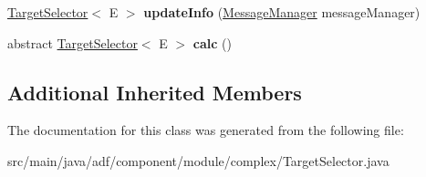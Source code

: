 \begin{DoxyCompactItemize}
\hypertarget{classadf_1_1component_1_1module_1_1complex_1_1TargetSelector_a91278e0b3b662efd8617e96309248942}{}\label{classadf_1_1component_1_1module_1_1complex_1_1TargetSelector_a91278e0b3b662efd8617e96309248942} 
\hyperlink{classadf_1_1component_1_1module_1_1complex_1_1TargetSelector}{Target\+Selector}$<$ E $>$ {\bfseries update\+Info} (\hyperlink{classadf_1_1agent_1_1communication_1_1MessageManager}{Message\+Manager} message\+Manager)
\item 
\hypertarget{classadf_1_1component_1_1module_1_1complex_1_1TargetSelector_a1e776672858945c16604c7e7e2e8eafe}{}\label{classadf_1_1component_1_1module_1_1complex_1_1TargetSelector_a1e776672858945c16604c7e7e2e8eafe} 
abstract \hyperlink{classadf_1_1component_1_1module_1_1complex_1_1TargetSelector}{Target\+Selector}$<$ E $>$ {\bfseries calc} ()
\end{DoxyCompactItemize}
\subsection*{Additional Inherited Members}


The documentation for this class was generated from the following file\+:\begin{DoxyCompactItemize}
\item 
src/main/java/adf/component/module/complex/Target\+Selector.\+java\end{DoxyCompactItemize}
